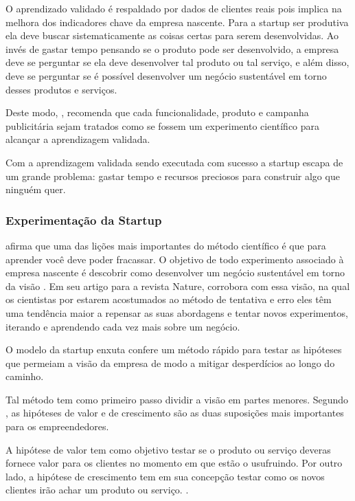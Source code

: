 O aprendizado validado é respaldado por dados de clientes reais pois implica na melhora dos indicadores chave da empresa nascente. Para a startup ser produtiva ela deve buscar sistematicamente as coisas certas para serem desenvolvidas. Ao invés de gastar tempo pensando se o produto pode ser desenvolvido, a empresa deve se perguntar se ela deve desenvolver tal produto ou tal serviço, e além disso, deve se perguntar se é possível desenvolver um negócio sustentável em torno desses produtos e serviços. \cite{leanstartup}

Deste modo, , recomenda que cada funcionalidade, produto e campanha publicitária sejam tratados como se fossem um experimento científico para alcançar a aprendizagem validada.

Com a aprendizagem validada sendo executada com sucesso a startup escapa de um grande problema: gastar tempo e recursos preciosos para construir algo que ninguém quer.

\subsubsection{Experimentação da Startup}
\label{cha:experimentacao_da_startup}

 afirma que uma das lições mais importantes do método científico é que para aprender você deve poder fracassar. O objetivo de todo experimento associado à empresa nascente é descobrir como desenvolver um negócio sustentável em torno da visão \cite{leanstartup}. Em seu artigo para a revista Nature,  corrobora com essa visão, na qual os cientistas por estarem acostumados ao método de tentativa e erro eles têm uma tendência maior a repensar as suas abordagens e tentar novos experimentos, iterando e aprendendo cada vez mais sobre um negócio.

O modelo da startup enxuta confere um método rápido para testar as hipóteses que permeiam a visão da empresa de modo a mitigar desperdícios ao longo do caminho.

Tal método tem como primeiro passo dividir a visão em partes menores. Segundo , as hipóteses de valor e de crescimento são as duas suposições mais importantes para os empreendedores.

A hipótese de valor tem como objetivo testar se o produto ou serviço deveras fornece valor para os clientes no momento em que estão o usufruindo. Por outro lado, a hipótese de crescimento tem em sua concepção testar como os novos clientes irão achar um produto ou serviço. \cite{leanstartup}.

